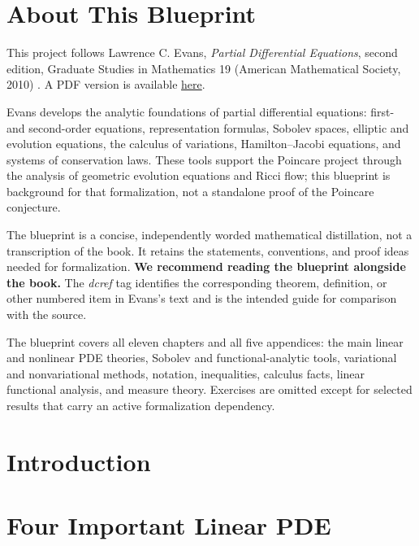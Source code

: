 

\chapter*{About This Blueprint}

This project follows Lawrence C. Evans, \emph{Partial Differential Equations},
second edition, Graduate Studies in Mathematics 19 (American Mathematical
Society, 2010) \cite{Evans2010}.
A PDF version is available
\href{https://math24.wordpress.com/wp-content/uploads/2013/02/partial-differential-equations-by-evans.pdf}{here}.

Evans develops the analytic foundations of partial differential equations:
first- and second-order equations, representation formulas, Sobolev spaces,
elliptic and evolution equations, the calculus of variations,
Hamilton--Jacobi equations, and systems of conservation laws. These tools
support the Poincare project through the analysis of geometric evolution
equations and Ricci flow; this blueprint is background for that formalization,
not a standalone proof of the Poincare conjecture.

The blueprint is a concise, independently worded mathematical distillation,
not a transcription of the book. It retains the statements, conventions, and
proof ideas needed for formalization. \textbf{We recommend reading the
blueprint alongside the book.} The \emph{dcref} tag identifies the
corresponding theorem, definition, or other numbered item in Evans's text and
is the intended guide for comparison with the source.

The blueprint covers all eleven chapters and all five appendices: the main
linear and nonlinear PDE theories, Sobolev and functional-analytic tools,
variational and nonvariational methods, notation, inequalities, calculus
facts, linear functional analysis, and measure theory. Exercises are omitted
except for selected results that carry an active formalization dependency.

\chapter{Introduction}
\label{chap:introduction}


\chapter{Four Important Linear PDE}
\label{chap:four-important-linear-pde}


